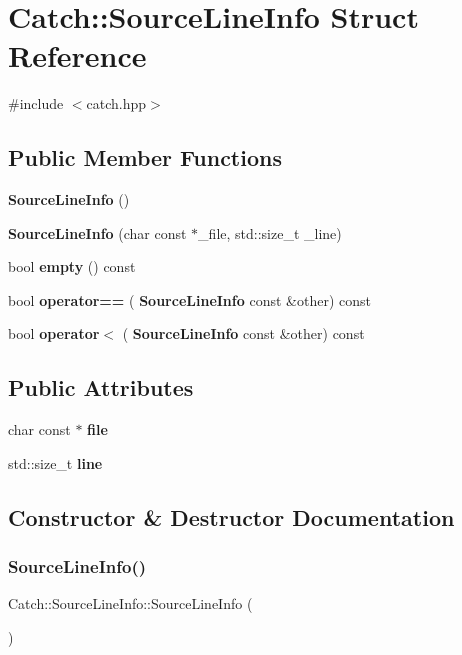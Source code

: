 \section{Catch\+:\+:Source\+Line\+Info Struct Reference}
\label{struct_catch_1_1_source_line_info}


{\ttfamily \#include $<$catch.\+hpp$>$}

\subsection*{Public Member Functions}
\begin{DoxyCompactItemize}
\item 
\textbf{ Source\+Line\+Info} ()
\item 
\textbf{ Source\+Line\+Info} (char const $\ast$\+\_\+file, std\+::size\+\_\+t \+\_\+line)
\item 
bool \textbf{ empty} () const
\item 
bool \textbf{ operator==} (\textbf{ Source\+Line\+Info} const \&other) const
\item 
bool \textbf{ operator$<$} (\textbf{ Source\+Line\+Info} const \&other) const
\end{DoxyCompactItemize}
\subsection*{Public Attributes}
\begin{DoxyCompactItemize}
\item 
char const  $\ast$ \textbf{ file}
\item 
std\+::size\+\_\+t \textbf{ line}
\end{DoxyCompactItemize}


\subsection{Constructor \& Destructor Documentation}
\mbox{\label{struct_catch_1_1_source_line_info_a9d44b2e1133794eee0bd5716424c83d6}} 
\subsubsection{Source\+Line\+Info()\hspace{0.1cm}{\footnotesize\ttfamily [1/2]}}
{\footnotesize\ttfamily Catch\+::\+Source\+Line\+Info\+::\+Source\+Line\+Info (\begin{DoxyParamCaption}{ }\end{DoxyParamCaption})}

